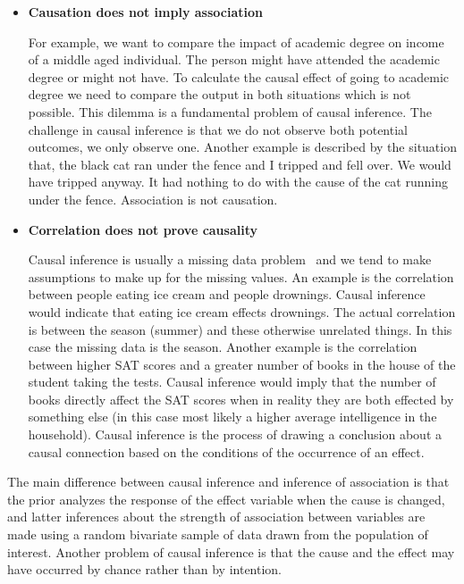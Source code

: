 \begin{itemize} %

    \item \textbf{Causation does not imply association}
    
    For example, we want to compare the impact of academic degree on income of a middle aged individual. 
    The person might have attended the academic degree or might not have. 
    To calculate the causal effect of going to academic degree we need to compare the output in both situations which is not possible. 
    This dilemma is a fundamental problem of causal inference. 
    The challenge in causal inference is that we do not observe both potential outcomes, we only observe one.
    Another example is described by the situation that, the black cat ran under the fence and I tripped and fell over. 
    We would have tripped anyway. 
    It had nothing to do with the cause of the cat running under the fence.
    Association is not causation.
    
    \item \textbf{Correlation does not prove causality}
    
    Causal inference is usually a missing data problem~\cite{guo2020survey} and we tend to make assumptions to make up for the missing values. 
    An example is the correlation between people eating ice cream and people drownings. 
    Causal inference would indicate that eating ice cream effects drownings. 
    The actual correlation is between the season (summer) and these otherwise unrelated things. 
    In this case the missing data is the season. 
    Another example is the correlation between higher SAT scores and a greater number of books in the house of the student taking the tests. 
    Causal inference would imply that the number of books directly affect the SAT scores when in reality they are both effected by something else (in this case most likely a higher average intelligence in the household). 
    Causal inference is the process of drawing a conclusion about a causal connection based on the conditions of the occurrence of an effect.
    
\end{itemize}

The main difference between causal inference and inference of association is that the prior analyzes the response of the effect variable when the cause is changed, and latter inferences about the strength of association between variables are made using a random bivariate sample of data drawn from the population of interest. 
Another problem of causal inference is that the cause and the effect may have occurred by chance rather than by intention.

